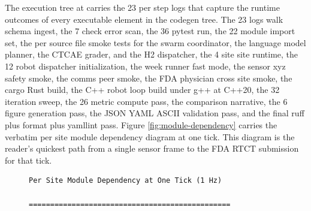 \begin{sectionaccent}
The execution tree at  carries the 23 per step
logs that capture the runtime outcomes of every executable element
in the codegen tree. The 23 logs walk schema ingest, the 7 check
error scan, the 36 pytest run, the 22 module import set, the per
source file smoke tests for the swarm coordinator, the language
model planner, the CTCAE grader, and the H2 dispatcher, the 4 site
site runtime, the 12 robot dispatcher initialization, the week
runner fast mode, the sensor xyz safety smoke, the comms peer smoke,
the FDA physician cross site smoke, the cargo Rust build, the C++
robot loop build under g++ at C++20, the 32 iteration sweep, the 26
metric compute pass, the comparison narrative, the 6 figure
generation pass, the JSON YAML ASCII validation pass, and the final
ruff plus format plus yamllint pass. Figure
\ref{fig:module-dependency} carries the verbatim per site module
dependency diagram at one tick. This diagram is the reader's quickest
path from a single sensor frame to the FDA RTCT submission for that
tick.

\begin{figure}[H]
\centering
\begin{Verbatim}[fontsize=\footnotesize]
                Per Site Module Dependency at One Tick (1 Hz)
                ===============================================


\end{Verbatim}
\end{figure}
\end{sectionaccent}
